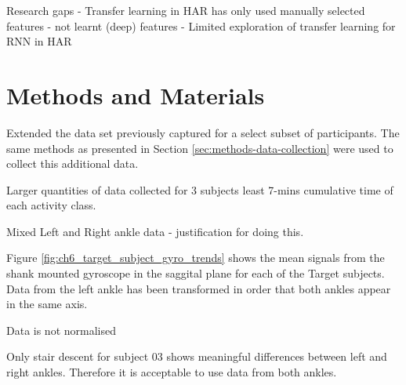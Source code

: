 Research gaps
- Transfer learning in HAR has only used manually selected features - not learnt (deep) features
- Limited exploration of transfer learning for RNN in HAR

\section{Methods and Materials}

Extended the data set previously captured for a select subset of participants. The same methods as presented in Section \ref{sec:methods-data-collection} were used to collect this additional data.

Larger quantities of data collected for 3 subjects least 7-mins cumulative time of each activity class. 

Mixed Left and Right ankle data - justification for doing this.

Figure \ref{fig:ch6_target_subject_gyro_trends} shows the mean signals from the shank mounted gyroscope in the saggital plane for each of the Target subjects. Data from the left ankle has been transformed in order that both ankles appear in the same axis.

Data is not normalised

Only stair descent for subject 03 shows meaningful differences between left and right ankles. Therefore it is acceptable to use data from both ankles.

